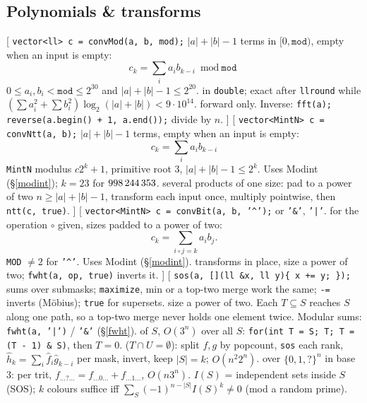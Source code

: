 \subsection{Polynomials \& transforms}
[
	 \texttt{vector<ll> c = convMod(a, b, mod);}
	 $|a| + |b| - 1$ terms in ${[0, \texttt{mod})}$, empty when an input is empty:
	\[ c_k = \sum_i a_i b_{k-i} \bmod \texttt{mod} \]
	 $0 \le a_i, b_i < \texttt{mod} \le 2^{30}$ and $|a| + |b| - 1 \le 2^{20}$.
	 in \texttt{double}; exact after \texttt{llround} while $(\sum a_i^2 + \sum b_i^2) \log_2(|a| + |b|) < 9 \cdot 10^{14}$.
	 forward only. Inverse: \texttt{fft(a); reverse(a.begin() + 1, a.end());} divide by $n$.
]\label{fft}
[
	 \texttt{vector<MintN> c = convNtt(a, b);}
	 $|a| + |b| - 1$ terms, empty when an input is empty:
	\[ c_k = \sum_i a_i b_{k-i} \]
	 \texttt{MintN} modulus $c2^k+1$, primitive root 3, $|a|+|b|-1 \le 2^k$. Uses Modint (\S\ref{modint}); $k=23$ for $998\,244\,353$.
	 several products of one size: pad to a power of two $n \ge |a| + |b| - 1$, transform each input once, multiply pointwise, then \texttt{ntt(c, true)}.
]\label{ntt}
[
	 \texttt{vector<MintN> c = convBit(a, b, '\textasciicircum');} or \texttt{'\&'}, \texttt{'|'}.
	 for the operation $\circ$ given, sizes padded to a power of two:
	\[ c_k = \sum_{i \circ j = k} a_i b_j. \]
	 \texttt{MOD} $\ne 2$ for \texttt{'\textasciicircum'}. Uses Modint (\S\ref{modint}).
	 transforms in place, size a power of two; \texttt{fwht(a, op, true)} inverts it.
]\label{fwht}
[
	 \texttt{sos(a, [](ll \&x, ll y)\{ x += y; \});} sums over submasks; \texttt{maximize}, min or a top-two merge work the same; \texttt{-=} inverts (Möbius); \texttt{true} for supersets.
	 size a power of two. Each $T \subseteq S$ reaches $S$ along one path, so a top-two merge never holds one element twice. Modular sums: \texttt{fwht(a, '|')} / \texttt{'\&'} (\S\ref{fwht}).
	 of $S$, $O(3^n)$ over all $S$: \texttt{for(int T = S; T; T = (T - 1) \& S)}, then $T = 0$.
	 ($T \cap U = \emptyset$): split $f, g$ by popcount, \texttt{sos} each rank, $\hat h_k = \sum_i \hat f_i \hat g_{k-i}$ per mask, invert, keep $|S| = k$; $O(n^2 2^n)$.
	 over $\{0,1,?\}^n$ in base 3: per trit, $f_{\dots ? \dots} = f_{\dots 0 \dots} + f_{\dots 1 \dots}$, $O(n 3^n)$.
	 $I(S)$ = independent sets inside $S$ (SOS); $k$ colours suffice iff $\sum_S (-1)^{n-|S|} I(S)^k \ne 0$ (mod a random prime).
